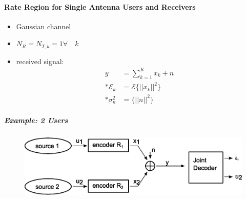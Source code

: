 \documentclass[a4paper, 10pt]{article}
\begin{document}
\paragraph{Rate Region for Single Antenna Users and Receivers}
\begin{itemize}
	\item Gaussian channel
	\item $N_R = N_{T,k} = 1 \forall\quad k $
	\item received signal: 
	\begin{align*}
		y &= \sum\limits_{k = 1}^{K}x_k + n\\ * \mathcal{E}_k &= \mathcal{E}\bigl\{||x_k||^2\bigr\} \\ *\sigma_n^2 &= \bigl\{||n||^2\bigr\}
	\end{align*}
\end{itemize}
\subparagraph*{Example: 2 Users}
\begin{figure}[h]\centering
	\includegraphics[scale=0.6]{Rate_Region_Example}
\end{figure}
\end{document}
